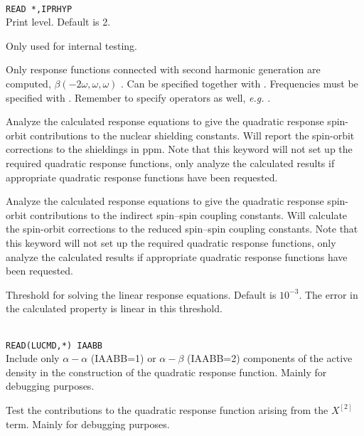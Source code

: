 \begin{description}
\item{}\\
\verb|READ *,IPRHYP|\\
Print level. Default is 2.

\item{} Only used for internal testing.

\item{}
Only response functions connected with second harmonic
generation
are computed, $\beta(-2\omega,\omega,\omega)$ .
Can be specified together with .
Frequencies must be specified with .
Remember to specify operators as well, {\it e.g.\/} .

\item{}
Analyze the calculated response equations to give the quadratic
response spin-orbit contributions to the nuclear shielding
constants. Will report the spin-orbit corrections to the shieldings in
ppm. Note that this keyword will not set up the required quadratic
response functions, only analyze the calculated results if appropriate
quadratic response functions have been requested.

\item{}
Analyze the calculated response equations to give the quadratic
response spin-orbit contributions to the indirect spin--spin coupling
constants. Will calculate the spin-orbit corrections to the reduced spin--spin
coupling constants. Note that this keyword will not set up the
required quadratic
response functions, only analyze the calculated results if appropriate
quadratic response functions have been requested.

\item{}
Threshold for solving the linear response equations.
Default is $10^{-3}$. The error in the calculated property is linear
in this threshold.

\item{}\\
\verb|READ(LUCMD,*) IAABB|\\
Include only $\alpha-\alpha$ (IAABB=1) or $\alpha-\beta$ (IAABB=2)
components of the active density in the construction of the quadratic
response function. Mainly for debugging purposes.

\item{}
Test the contributions to the quadratic response function arising from
the $X^{\left[2\right]}$ term. Mainly for debugging purposes.

\end{description}


